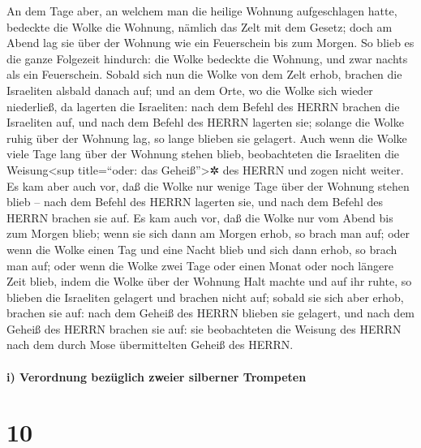 An dem Tage aber, an welchem man die heilige Wohnung
aufgeschlagen hatte, bedeckte die Wolke die Wohnung, nämlich das Zelt
mit dem Gesetz; doch am Abend lag sie über der Wohnung wie ein
Feuerschein bis zum Morgen. So blieb es die ganze
Folgezeit hindurch: die Wolke bedeckte die Wohnung, und zwar nachts als
ein Feuerschein. Sobald sich nun die Wolke von dem Zelt
erhob, brachen die Israeliten alsbald danach auf; und an dem Orte, wo
die Wolke sich wieder niederließ, da lagerten die Israeliten:
nach dem Befehl des HERRN brachen die Israeliten auf, und
nach dem Befehl des HERRN lagerten sie; solange die Wolke ruhig über der
Wohnung lag, so lange blieben sie gelagert. Auch wenn die
Wolke viele Tage lang über der Wohnung stehen blieb, beobachteten die
Israeliten die Weisung\textless sup title=``oder: das
Geheiß''\textgreater✲ des HERRN und zogen nicht weiter.
Es kam aber auch vor, daß die Wolke nur wenige Tage über
der Wohnung stehen blieb -- nach dem Befehl des HERRN lagerten sie, und
nach dem Befehl des HERRN brachen sie auf. Es kam auch
vor, daß die Wolke nur vom Abend bis zum Morgen blieb; wenn sie sich
dann am Morgen erhob, so brach man auf; oder wenn die Wolke einen Tag
und eine Nacht blieb und sich dann erhob, so brach man auf;
oder wenn die Wolke zwei Tage oder einen Monat oder noch
längere Zeit blieb, indem die Wolke über der Wohnung Halt machte und auf
ihr ruhte, so blieben die Israeliten gelagert und brachen nicht auf;
sobald sie sich aber erhob, brachen sie auf: nach dem
Geheiß des HERRN blieben sie gelagert, und nach dem Geheiß des HERRN
brachen sie auf: sie beobachteten die Weisung des HERRN nach dem durch
Mose übermittelten Geheiß des HERRN.

\hypertarget{i-verordnung-bezuxfcglich-zweier-silberner-trompeten}{%
\paragraph{i) Verordnung bezüglich zweier silberner
Trompeten}\label{i-verordnung-bezuxfcglich-zweier-silberner-trompeten}}

\hypertarget{section-9}{%
\section{10}\label{section-9}}

